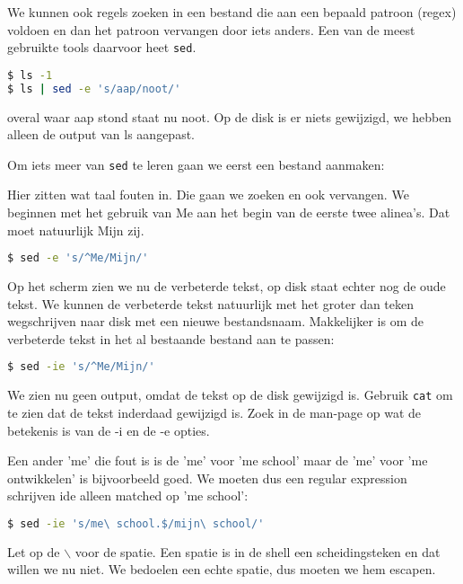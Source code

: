 We kunnen ook regels zoeken in een bestand die aan een bepaald patroon (regex) voldoen en dan het patroon vervangen door iets anders. Een van de meest gebruikte tools daarvoor heet \texttt{sed}.

\begin{lstlisting}[language=bash]
$ ls -1
$ ls | sed -e 's/aap/noot/'
\end{lstlisting}
overal waar aap stond staat nu noot. Op de disk is er niets gewijzigd, we hebben alleen de output van ls aangepast.

Om iets meer van \texttt{sed} te leren gaan we eerst een bestand aanmaken:


Hier zitten wat taal fouten in. Die gaan we zoeken en ook vervangen. We beginnen met het gebruik van Me aan het begin van de eerste twee alinea's. Dat moet natuurlijk Mijn zij.
\begin{lstlisting}[language=bash]
$ sed -e 's/^Me/Mijn/'
\end{lstlisting}
Op het scherm zien we nu de verbeterde tekst, op disk staat echter nog de oude tekst. We kunnen de verbeterde tekst natuurlijk met het groter dan teken wegschrijven naar disk met een nieuwe bestandsnaam. Makkelijker is om de verbeterde tekst in het al bestaande bestand aan te passen:
\begin{lstlisting}[language=bash]
$ sed -ie 's/^Me/Mijn/'
\end{lstlisting}
We zien nu geen output, omdat de tekst op de disk gewijzigd is. Gebruik \texttt{cat} om te zien dat de tekst inderdaad gewijzigd is. Zoek in de man-page op wat de betekenis is van de -i en de -e opties.

Een ander 'me' die fout is is de 'me' voor 'me school' maar de 'me' voor 'me ontwikkelen' is bijvoorbeeld goed. We moeten dus een regular expression schrijven ide alleen matched op 'me school':
\begin{lstlisting}[language=bash]
$ sed -ie 's/me\ school.$/mijn\ school/'
\end{lstlisting}
Let op de $\backslash$ voor de spatie. Een spatie is in de shell een scheidingsteken en dat willen we nu niet. We bedoelen een echte spatie, dus moeten we hem escapen.
